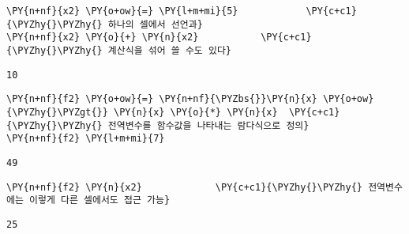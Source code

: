     
    \begin{tcolorbox}[breakable, size=fbox, boxrule=1pt, pad at break*=1mm,colback=cellbackground, colframe=cellborder, top=.75ex]
\begin{Verbatim}[commandchars=\\\{\}]
\PY{n+nf}{x2} \PY{o+ow}{=} \PY{l+m+mi}{5}            \PY{c+c1}{\PYZhy{}\PYZhy{} 하나의 셀에서 선언과}
\PY{n+nf}{x2} \PY{o}{+} \PY{n}{x2}           \PY{c+c1}{\PYZhy{}\PYZhy{} 계산식을 섞어 쓸 수도 있다}
\end{Verbatim}
\end{tcolorbox}

    
    \begin{Verbatim}[commandchars=\\\{\}]
10
    \end{Verbatim}

    
    \begin{tcolorbox}[breakable, size=fbox, boxrule=1pt, pad at break*=1mm,colback=cellbackground, colframe=cellborder, top=.75ex]
\begin{Verbatim}[commandchars=\\\{\}]
\PY{n+nf}{f2} \PY{o+ow}{=} \PY{n+nf}{\PYZbs{}}\PY{n}{x} \PY{o+ow}{\PYZhy{}\PYZgt{}} \PY{n}{x} \PY{o}{*} \PY{n}{x}  \PY{c+c1}{\PYZhy{}\PYZhy{} 전역변수를 함수값을 나타내는 람다식으로 정의}
\PY{n+nf}{f2} \PY{l+m+mi}{7}
\end{Verbatim}
\end{tcolorbox}

    
    \begin{Verbatim}[commandchars=\\\{\}]
49
    \end{Verbatim}

    
    \begin{tcolorbox}[breakable, size=fbox, boxrule=1pt, pad at break*=1mm,colback=cellbackground, colframe=cellborder, top=.75ex]
\begin{Verbatim}[commandchars=\\\{\}]
\PY{n+nf}{f2} \PY{n}{x2}             \PY{c+c1}{\PYZhy{}\PYZhy{} 전역변수에는 이렇게 다른 셀에서도 접근 가능}
\end{Verbatim}
\end{tcolorbox}

    
    \begin{Verbatim}[commandchars=\\\{\}]
25
    \end{Verbatim}

